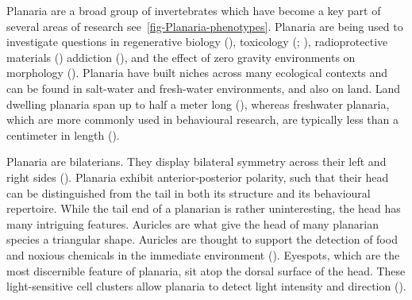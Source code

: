 \documentclass[
  jou,
  floatsintext,
  longtable,
  nolmodern,
  notxfonts,
  notimes,
  donotrepeattitle,
  colorlinks=true,linkcolor=blue,citecolor=blue,urlcolor=blue]{apa7}
\begin{document}
Planaria are a broad group of invertebrates which have become a key part
of several areas of research see~\ref{fig-Planaria-phenotypes}. Planaria
are being used to investigate questions in regenerative biology
(), toxicology
(;
), radioprotective
materials ()
addiction (), and the
effect of zero gravity environments on morphology
(). Planaria have built niches across many
ecological contexts and can be found in salt-water and fresh-water
environments, and also on land. Land dwelling planaria span up to half a
meter long (), whereas
freshwater planaria, which are more commonly used in behavioural
research, are typically less than a centimeter in length
().

Planaria are bilaterians. They display bilateral symmetry across their
left and right sides (). Planaria exhibit anterior-posterior polarity, such that
their head can be distinguished from the tail in both its structure and
its behavioural repertoire. While the tail end of a planarian is rather
uninteresting, the head has many intriguing features. Auricles are what
give the head of many planarian species a triangular shape. Auricles are
thought to support the detection of food and noxious chemicals in the
immediate environment (). Eyespots, which are the most discernible feature of
planaria, sit atop the dorsal surface of the head. These light-sensitive
cell clusters allow planaria to detect light intensity and direction
().
\end{document}
